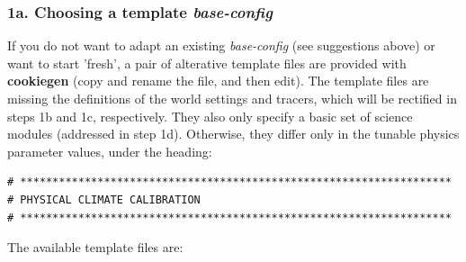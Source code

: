 \subsubsection{1a. Choosing a template \textit{base-config}}

If you do not want to adapt an existing \textit{base-config} (see suggestions above) or want to start 'fresh', a pair of alterative template files are provided with \textbf{cookiegen} (copy and rename the file, and then edit). The template files are missing the definitions of the world settings and tracers, which will be rectified in steps 1b and 1c, respectively. They also only specify a basic set of science modules (addressed in step 1d). Otherwise, they differ only in the tunable physics parameter values, under the heading:

\footnotesize\vspace{-2pt}\begin{verbatim}
# *******************************************************************
# PHYSICAL CLIMATE CALIBRATION
# *******************************************************************
\end{verbatim}\vspace{-2pt}\normalsize

The available template files are:


